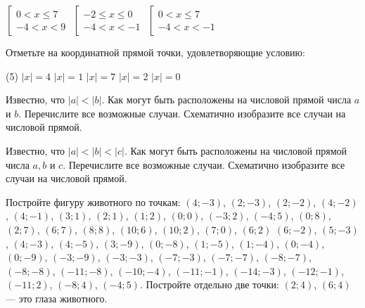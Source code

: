 \begin{class}[number=2]
\begin{listofex}
\begin{tasks}
			\task \( \left[
			\begin{array}{l} 0<x \le 7 \\ -4 < x < 9 \end{array} \right. \)
			\task \( \left[
			\begin{array}{l} -2 \le x \le 0 \\ -4<x<-1 \end{array} \right. \)
			\task \( \left[
			\begin{array}{l} 0<x \le 7 \\ -4<x<-1 \end{array} \right. \)
		\end{tasks}
		\item Отметьте на координатной прямой точки, удовлетворяющие условию:
		\begin{tasks}(5)
			\task \( |x|=4 \)
			\task \( |x|=1 \)
			\task \( |x|=7 \)
			\task \( |x|=2 \)
			\task \( |x|=0 \)
		\end{tasks}
		\item Известно, что \( |a|<|b| \). Как могут быть расположены на числовой прямой числа \( a \) и \( b \). Перечислите все возможные случаи. Схематично изобразите все случаи на числовой прямой.
		\item Известно, что \( |a|<|b|<|c| \). Как могут быть расположены на числовой прямой числа \(a, b\) и \(c\). Перечислите все возможные случаи. Схематично изобразите все случаи на числовой прямой.
		\item Постройте фигуру животного по точкам: \( (4;-3) \), \( (2;-3) \), \( (2;-2) \), \( (4;-2) \), \( (4;-1) \), \( (3;1) \), \( (2;1) \), \( (1;2) \), \( (0;0) \), \( (-3;2) \), \( (-4;5) \), \( (0;8) \), \( (2;7) \), \( (6;7) \), \( (8;8) \), \( (10;6) \), \( (10;2) \), \( (7;0) \), \( (6;2) \) \( (6;-2) \), \( (5;-3) \), \( (4;-3) \), \( (4;-5) \), \( (3;-9) \), \( (0;-8) \), \( (1;-5) \), \( (1;-4) \), \( (0;-4) \), \( (0;-9) \), \( (-3;-9) \), \( (-3;-3) \), \( (-7;-3) \), \( (-7;-7) \),  \( (-8;-7) \), \( (-8;-8) \), \( (-11;-8) \), \( (-10;-4) \), \( (-11;-1) \), \( (-14;-3) \), \( (-12;-1) \), \( (-11;2) \), \( (-8;4) \), \( (-4;5) \). Постройте отдельно две точки: \( (2;4) \), \( (6;4) \) --- это глаза животного.
	\end{listofex}
\end{class}

